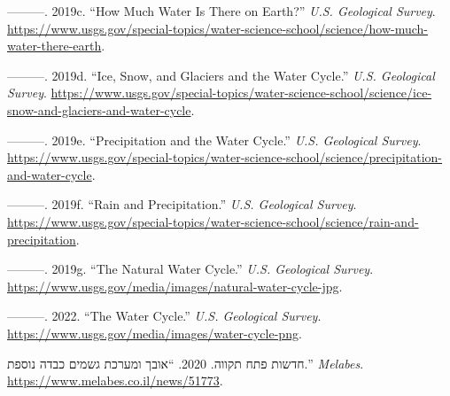 \documentclass[
  letterpaper,
  DIV=11,
  numbers=noendperiod]{scrreprt}
\newlength{\cslhangindent}
\newlength{\cslentryspacingunit} %
\newenvironment{CSLReferences}[2] %
 {%
  \setlength{\parindent}{0pt}
  \ifodd #1
  \let\oldpar\par
  \def\par{\hangindent=\cslhangindent\oldpar}
  \fi
  \setlength{\parskip}{#2\cslentryspacingunit}
 }%
 {}
\begin{document}
\begin{CSLReferences}{1}{0}
\leavevmode{}%
---------. 2019c. {``How Much Water Is There on Earth?''} \emph{U.S.
Geological Survey}.
\url{https://www.usgs.gov/special-topics/water-science-school/science/how-much-water-there-earth}.

\leavevmode{}%
---------. 2019d. {``Ice, Snow, and Glaciers and the Water Cycle.''}
\emph{U.S. Geological Survey}.
\url{https://www.usgs.gov/special-topics/water-science-school/science/ice-snow-and-glaciers-and-water-cycle}.

\leavevmode{}%
---------. 2019e. {``Precipitation and the Water Cycle.''} \emph{U.S.
Geological Survey}.
\url{https://www.usgs.gov/special-topics/water-science-school/science/precipitation-and-water-cycle}.

\leavevmode{}%
---------. 2019f. {``Rain and Precipitation.''} \emph{U.S. Geological
Survey}.
\url{https://www.usgs.gov/special-topics/water-science-school/science/rain-and-precipitation}.

\leavevmode{}%
---------. 2019g. {``The Natural Water Cycle.''} \emph{U.S. Geological
Survey}.
\url{https://www.usgs.gov/media/images/natural-water-cycle-jpg}.

\leavevmode{}%
---------. 2022. {``The Water Cycle.''} \emph{U.S. Geological Survey}.
\url{https://www.usgs.gov/media/images/water-cycle-png}.

\leavevmode{}%
חדשות פתח תקווה. 2020. {``אובך ומערכת גשמים כבדה נוספת.''}
\emph{Melabes}. \url{https://www.melabes.co.il/news/51773}.

\end{CSLReferences}
\end{document}
